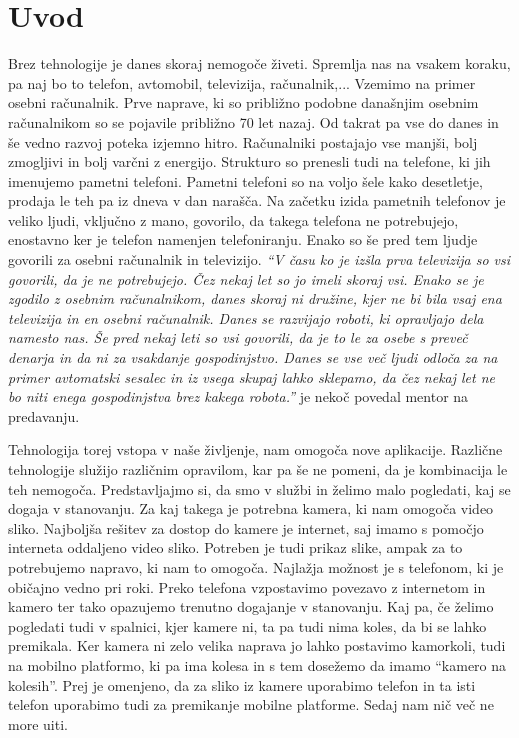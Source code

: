 \documentclass[a4paper, 12pt]{book}
\begin{document}
\chapter{Uvod}
Brez tehnologije je danes skoraj nemogoče živeti. Spremlja nas na vsakem koraku, pa naj bo to telefon, avtomobil, televizija, računalnik,... Vzemimo na primer osebni računalnik. Prve naprave, ki so približno podobne današnjim osebnim računalnikom so se pojavile približno 70 let nazaj. Od takrat pa vse do danes in še vedno razvoj poteka izjemno hitro. Ra\-ču\-nal\-ni\-ki postajajo vse manjši, bolj zmogljivi in bolj varčni z energijo. Strukturo so prenesli tudi na telefone, ki jih imenujemo pametni telefoni. Pametni telefoni so na voljo šele kako desetletje, prodaja le teh pa iz dneva v dan narašča. Na začetku izida pametnih telefonov je veliko ljudi, vključno z mano, govorilo, da takega telefona ne potrebujejo, enostavno ker je telefon namenjen telefoniranju. Enako so še pred tem ljudje govorili za osebni računalnik in televizijo. {\it ``V času ko je izšla prva televizija so vsi govorili, da je ne potrebujejo. Čez nekaj let so jo imeli skoraj vsi. Enako se je zgodilo z osebnim računalnikom, danes skoraj ni družine, kjer ne bi bila vsaj ena televizija in en osebni računalnik. Danes se razvijajo roboti, ki opravljajo dela namesto nas. Še pred nekaj leti so vsi govorili, da je to le za osebe s preveč denarja in da ni za vsakdanje gospodinjstvo. Danes se vse več ljudi odloča za na primer avtomatski sesalec in iz vsega skupaj lahko sklepamo, da čez nekaj let ne bo niti enega gospodinjstva brez kakega robota.''} je nekoč povedal mentor na predavanju.

Tehnologija torej vstopa v naše življenje, nam omogoča nove aplikacije. Različne tehnologije služijo različnim opravilom, kar pa še ne pomeni, da je kombinacija le teh nemogoča. Predstavljajmo si, da smo v službi in želimo malo pogledati, kaj se dogaja v stanovanju. Za kaj takega je potrebna kamera, ki nam omogoča video sliko. Najboljša rešitev za dostop do kamere je internet, saj imamo s pomočjo interneta oddaljeno video sliko. Potreben je tudi prikaz slike, ampak za to potrebujemo napravo, ki nam to omogoča. Najlažja možnost je s telefonom, ki je običajno vedno pri roki. Preko telefona vzpostavimo povezavo z internetom in kamero ter tako opazujemo trenutno dogajanje v stanovanju. Kaj pa, če želimo pogledati tudi v spalnici, kjer kamere ni, ta pa tudi nima koles, da bi se lahko premikala. Ker kamera ni zelo velika naprava jo lahko postavimo kamorkoli, tudi na mobilno platformo, ki pa ima kolesa in s tem dosežemo da imamo ``kamero na kolesih''. Prej je omenjeno, da za sliko iz kamere uporabimo telefon in ta isti telefon uporabimo tudi za premikanje mobilne platforme. Sedaj nam nič več ne more uiti. 
\end{document}
